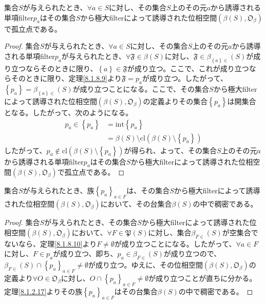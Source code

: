 \documentclass[dvipdfmx]{jsarticle}
\begin{document}
\begin{thm}\label{8.1.8.14}
集合$S$が与えられたとき、$\forall a \in S$に対し、その集合$S$上のその元$a$から誘導される単項filter$p_{a}$はその集合$S$から極大filterによって誘導された位相空間$\left( \beta(S),\mathfrak{O}_{\beta} \right)$で孤立点である。
\end{thm}
\begin{proof}
集合$S$が与えられたとき、$\forall a \in S$に対し、その集合$S$上のその元$a$から誘導される単項filter$p_{a}$が与えられたとき、$\mathfrak{\forall F \in}\beta(S)$に対し、$\mathfrak{F}\in \beta_{\left\{ a \right\} \in}(S)$が成り立つならそのときに限り、$\left\{ a \right\}\in \mathfrak{F}$が成り立つ。ここで、これが成り立つならそのときに限り、定理\ref{8.1.8.9}より$\mathfrak{F} = p_{a}$が成り立つ。したがって、$\left\{ p_{a} \right\} = \beta_{\left\{ a \right\} \in}(S)$が成り立つことになる。ここで、その集合$S$から極大filterによって誘導された位相空間$\left( \beta(S),\mathfrak{O}_{\beta} \right)$の定義よりその集合$\left\{ p_{a} \right\}$は開集合となる。したがって、次のようになる。
\begin{align*}
p_{a} \in \left\{ p_{a} \right\} &= {\mathrm{int}}\left\{ p_{a} \right\}\\
&= \beta(S) \setminus {\mathrm{cl}}\left( \beta(S) \setminus \left\{ p_{a} \right\} \right)
\end{align*}
したがって、$p_{a} \notin {\mathrm{cl}}\left( \beta(S) \setminus \left\{ p_{a} \right\} \right)$が得られ、よって、その集合$S$上のその元$a$から誘導される単項filter$p_{a}$はその集合$S$から極大filterによって誘導された位相空間$\left( \beta(S),\mathfrak{O}_{\beta} \right)$で孤立点である。
\end{proof}
\begin{thm}\label{8.1.8.15}
集合$S$が与えられたとき、族$\left\{ p_{a} \right\}_{a \in F}$は、その集合$S$から極大filterによって誘導された位相空間$\left( \beta(S),\mathfrak{O}_{\beta} \right)$において、その台集合$\beta(S)$の中で稠密である。
\end{thm}
\begin{proof}
集合$S$が与えられたとき、その集合$S$から極大filterによって誘導された位相空間$\left( \beta(S),\mathfrak{O}_{\beta} \right)$において、$\forall F \in \mathfrak{P}(S)$に対し、集合$\beta_{F \in}(S)$が空集合でないなら、定理\ref{8.1.8.10}より$F \neq \emptyset$が成り立つことになる。したがって、$\forall a \in F$に対し、$F \in p_{a}$が成り立つ、即ち、$p_{a} \in \beta_{F \in}(S)$が成り立つので、$\beta_{F \in}(S) \cap \left\{ p_{a} \right\}_{a \in F} \neq \emptyset$が成り立つ。ゆえに、その位相空間$\left( \beta(S),\mathfrak{O}_{\beta} \right)$の定義より$\forall O \in \mathfrak{O}_{\beta}$に対し、$O \cap \left\{ p_{a} \right\}_{a \in F} \neq \emptyset$が成り立つことが直ちに分かる。定理\ref{8.1.2.17}よりその族$\left\{ p_{a} \right\}_{a \in F}$はその台集合$\beta(S)$の中で稠密である。
\end{proof}
\end{document}
